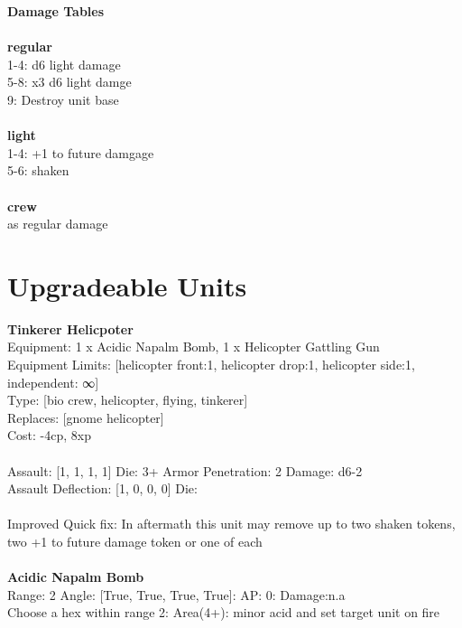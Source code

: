 {\bf Damage Tables} \\
\ \\ {\bf regular } \\
1-4: d6 light damage \\
5-8: x3 d6 light damge \\
9: Destroy unit base \\
\ \\ {\bf light } \\
1-4: +1 to future damgage \\
5-6: shaken \\
\ \\ {\bf crew } \\
as regular damage \\










\pagebreak\section{Upgradeable Units}{\bf Tinkerer Helicpoter } \\
Equipment: 1 x Acidic Napalm Bomb, 1 x Helicopter Gattling Gun \\
Equipment Limits: [helicopter front:1, helicopter drop:1, helicopter side:1, independent: ∞] \\
Type: [bio crew, helicopter, flying, tinkerer] \\
Replaces: [gnome helicopter] \\
Cost: -4cp, 8xp\\
\ \\
Assault: [1, 1, 1, 1] Die: 3+ Armor Penetration: 2 Damage: d6-2 \\
Assault Deflection: [1, 0, 0, 0] Die: \\
\indent  
\ \\
Improved Quick fix: In aftermath this unit may remove up to two shaken tokens, two +1 to future damage token or one of each\\ 

\ \\
{\bf Acidic Napalm Bomb } \\



Range: 2  Angle: [True, True, True, True]: AP: 0: Damage:n.a \\
Choose a hex within range 2: Area(4+): minor acid and set target unit on fire\\ 




